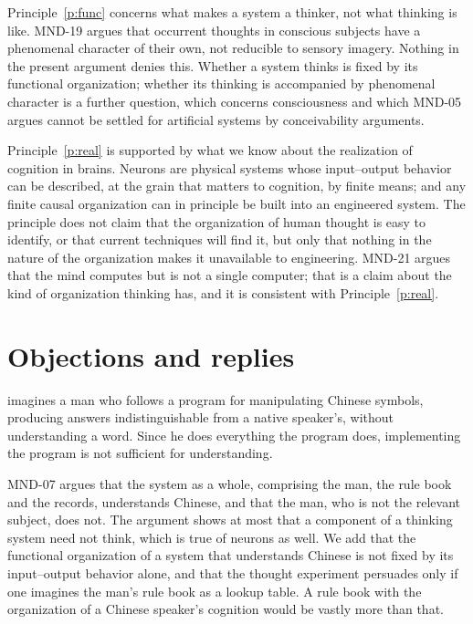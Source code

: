 \documentclass{situationist-preprint}
\begin{document}
Principle~\ref{p:func} concerns what makes a system a thinker, not what thinking is like. MND-19 argues that occurrent thoughts in conscious subjects have a phenomenal character of their own, not reducible to sensory imagery. Nothing in the present argument denies this. Whether a system thinks is fixed by its functional organization; whether its thinking is accompanied by phenomenal character is a further question, which concerns consciousness and which MND-05 argues cannot be settled for artificial systems by conceivability arguments.

Principle~\ref{p:real} is supported by what we know about the realization of cognition in brains. Neurons are physical systems whose input--output behavior can be described, at the grain that matters to cognition, by finite means; and any finite causal organization can in principle be built into an engineered system. The principle does not claim that the organization of human thought is easy to identify, or that current techniques will find it, but only that nothing in the nature of the organization makes it unavailable to engineering. MND-21 argues that the mind computes but is not a single computer; that is a claim about the kind of organization thinking has, and it is consistent with Principle~\ref{p:real}.

\section{Objections and replies}

\begin{objection}
\citet{Searle1980} imagines a man who follows a program for manipulating Chinese symbols, producing answers indistinguishable from a native speaker's, without understanding a word. Since he does everything the program does, implementing the program is not sufficient for understanding.
\end{objection}

\begin{reply}
MND-07 argues that the system as a whole, comprising the man, the rule book and the records, understands Chinese, and that the man, who is not the relevant subject, does not. The argument shows at most that a component of a thinking system need not think, which is true of neurons as well. We add that the functional organization of a system that understands Chinese is not fixed by its input--output behavior alone, and that the thought experiment persuades only if one imagines the man's rule book as a lookup table. A rule book with the organization of a Chinese speaker's cognition would be vastly more than that.
\end{reply}
\end{document}
